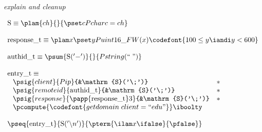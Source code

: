 {\em explain and cleanup}

\[
\begin{array}{l}
\mathrm{S} \equiv \plam {ch} {} {\pset c {Pchar} {c = {ch}}}\\
\\
\mathrm{response\_t} \equiv \plam x {} {
      \pset y {Puint16\_FW(x)} 
      {\codefont{100 \leq y \iandi y < 600}}
    }\\
\\
\mathrm{authid\_t} \equiv 
\psum {\mathrm{S}('-')} {} {Pstring(``\;")}\\
\\
\mathrm{entry\_t} \equiv \\ \;
\begin{array}{lll}
\psig {client} {Pip} {&\mathrm{S}('\;')} &* \\
\psig {remoteid} {\mathrm{authid\_t}} {&\mathrm{S}('\;')} &* \\
\psig {response} {
  \papp
    {\mathrm{response\_t}} 3
}{&\mathrm{S}('\;')} &*\\
\multicolumn{3}{c}{
\pcompute {\codefont{getdomain\;client = ``edu"}} \iboolty}
\end{array}\\
\\
\pseq {\mathrm{entry\_t}} {\mathrm{S}('\backslash n')}{
  \pterm {\ilam x {} \ifalse} {\pfalse}
}
\end{array}
\]


